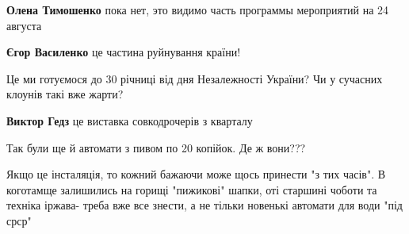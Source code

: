 \begin{itemize}
\begin{itemize}
 
\textbf{Олена Тимошенко} пока нет, это видимо часть программы мероприятий на 24 августа

 
\textbf{Єгор Василенко} це частина руйнування країни!
\end{itemize}

 
Це ми готуємося до 30 річниці від дня Незалежності України? Чи у сучасних клоунів такі вже жарти?

\begin{itemize}
 
\textbf{Виктор Гедз} це виставка совкодрочерів з кварталу
\end{itemize}

 
Так були ще й автомати з пивом по 20 копійок. Де ж вони???

 

Якщо це інсталяція, то кожний бажаючи може щось принести "з тих часів". В
коготамще залишились на горищі "пижикові" шапки, оті старшині чоботи та техніка
іржава- треба вже все знести, а не тільки новенькі автомати для води "під срср"


\end{itemize}
